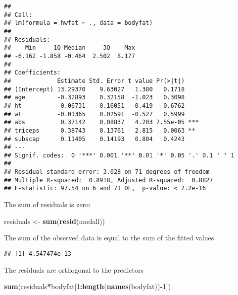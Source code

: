 \documentclass[]{article}
\newenvironment{Shaded}{\begin{snugshade}}{\end{snugshade}}
\newcommand{\DecValTok}[1]{\textcolor[rgb]{0.00,0.00,0.81}{#1}}
\newcommand{\KeywordTok}[1]{\textcolor[rgb]{0.13,0.29,0.53}{\textbf{#1}}}
\newcommand{\NormalTok}[1]{#1}
\newcommand{\OperatorTok}[1]{\textcolor[rgb]{0.81,0.36,0.00}{\textbf{#1}}}
\newcommand{\StringTok}[1]{\textcolor[rgb]{0.31,0.60,0.02}{#1}}
\begin{document}
\begin{verbatim}
## 
## Call:
## lm(formula = hwfat ~ ., data = bodyfat)
## 
## Residuals:
##    Min     1Q Median     3Q    Max 
## -6.162 -1.858 -0.464  2.502  8.177 
## 
## Coefficients:
##             Estimate Std. Error t value Pr(>|t|)    
## (Intercept) 13.29370    9.63027   1.380   0.1718    
## age         -0.32893    0.32158  -1.023   0.3098    
## ht          -0.06731    0.16051  -0.419   0.6762    
## wt          -0.01365    0.02591  -0.527   0.5999    
## abs          0.37142    0.08837   4.203 7.55e-05 ***
## triceps      0.38743    0.13761   2.815   0.0063 ** 
## subscap      0.11405    0.14193   0.804   0.4243    
## ---
## Signif. codes:  0 '***' 0.001 '**' 0.01 '*' 0.05 '.' 0.1 ' ' 1
## 
## Residual standard error: 3.028 on 71 degrees of freedom
## Multiple R-squared:  0.8918, Adjusted R-squared:  0.8827 
## F-statistic: 97.54 on 6 and 71 DF,  p-value: < 2.2e-16
\end{verbatim}

The sum of residuals is zero:

\begin{Shaded}
\begin{Highlighting}[]
\NormalTok{residuals <-}\StringTok{ }\KeywordTok{sum}\NormalTok{(}\KeywordTok{resid}\NormalTok{(modall))}
\end{Highlighting}
\end{Shaded}

The sum of the observed data is equal to the sum of the fitted values

\begin{Shaded}
\end{Shaded}

\begin{verbatim}
## [1] 4.547474e-13
\end{verbatim}

The residuals are orthogonal to the predictors

\begin{Shaded}
\begin{Highlighting}[]
\KeywordTok{sum}\NormalTok{(residuals}\OperatorTok{*}\NormalTok{bodyfat[}\DecValTok{1}\OperatorTok{:}\KeywordTok{length}\NormalTok{(}\KeywordTok{names}\NormalTok{(bodyfat))}\OperatorTok{-}\DecValTok{1}\NormalTok{])}
\end{Highlighting}
\end{Shaded}
\end{document}
